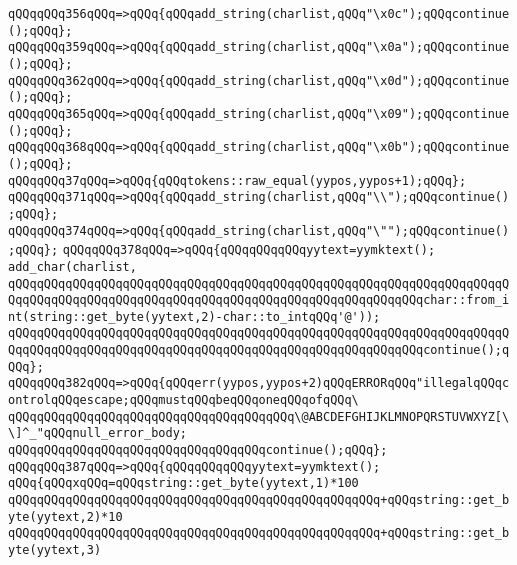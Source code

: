 \verb|qQQqqQQq356qQQq=>qQQq{qQQqadd_string(charlist,qQQq"\x0c");qQQqcontinue();qQQq};|\newline
\verb|qQQqqQQq359qQQq=>qQQq{qQQqadd_string(charlist,qQQq"\x0a");qQQqcontinue();qQQq};|\newline
\verb|qQQqqQQq362qQQq=>qQQq{qQQqadd_string(charlist,qQQq"\x0d");qQQqcontinue();qQQq};|\newline
\verb|qQQqqQQq365qQQq=>qQQq{qQQqadd_string(charlist,qQQq"\x09");qQQqcontinue();qQQq};|\newline
\verb|qQQqqQQq368qQQq=>qQQq{qQQqadd_string(charlist,qQQq"\x0b");qQQqcontinue();qQQq};|\newline
\verb|qQQqqQQq37qQQq=>qQQq{qQQqtokens::raw_equal(yypos,yypos+1);qQQq};|\newline
\verb|qQQqqQQq371qQQq=>qQQq{qQQqadd_string(charlist,qQQq"\\");qQQqcontinue();qQQq};|\newline
\verb|qQQqqQQq374qQQq=>qQQq{qQQqadd_string(charlist,qQQq"\"");qQQqcontinue();qQQq};|\newline
\verb|qQQqqQQq378qQQq=>qQQq{qQQqqQQqqQQqyytext=yymktext();|\newline
\verb|add_char(charlist,|\newline
\verb|qQQqqQQqqQQqqQQqqQQqqQQqqQQqqQQqqQQqqQQqqQQqqQQqqQQqqQQqqQQqqQQqqQQqqQQqqQQqqQQqqQQqqQQqqQQqqQQqqQQqqQQqqQQqqQQqqQQqqQQqqQQqqQQqchar::from_int(string::get_byte(yytext,2)-char::to_intqQQq'@'));|\newline
\verb|qQQqqQQqqQQqqQQqqQQqqQQqqQQqqQQqqQQqqQQqqQQqqQQqqQQqqQQqqQQqqQQqqQQqqQQqqQQqqQQqqQQqqQQqqQQqqQQqqQQqqQQqqQQqqQQqqQQqqQQqqQQqqQQqcontinue();qQQq};|\newline
\verb|qQQqqQQq382qQQq=>qQQq{qQQqerr(yypos,yypos+2)qQQqERRORqQQq"illegalqQQqcontrolqQQqescape;qQQqmustqQQqbeqQQqoneqQQqofqQQq\|\newline
\verb|qQQqqQQqqQQqqQQqqQQqqQQqqQQqqQQqqQQqqQQq\@ABCDEFGHIJKLMNOPQRSTUVWXYZ[\\]^_"qQQqnull_error_body;|\newline
\verb|qQQqqQQqqQQqqQQqqQQqqQQqqQQqqQQqqQQqcontinue();qQQq};|\newline
\verb|qQQqqQQq387qQQq=>qQQq{qQQqqQQqqQQqyytext=yymktext();|\newline
\verb|qQQq{qQQqxqQQq=qQQqstring::get_byte(yytext,1)*100|\newline
\verb|qQQqqQQqqQQqqQQqqQQqqQQqqQQqqQQqqQQqqQQqqQQqqQQqqQQq+qQQqstring::get_byte(yytext,2)*10|\newline
\verb|qQQqqQQqqQQqqQQqqQQqqQQqqQQqqQQqqQQqqQQqqQQqqQQqqQQq+qQQqstring::get_byte(yytext,3)|\newline
